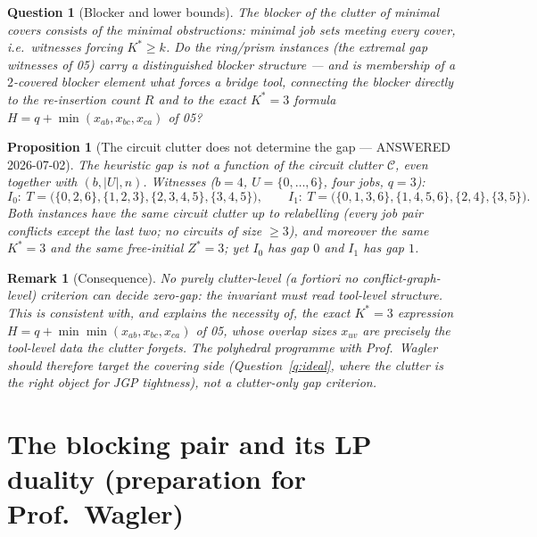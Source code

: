 \documentclass[11pt,a4paper]{article}
\newtheorem{proposition}{Proposition}
\newtheorem{question}{Question}
\newtheorem{remark}{Remark}
\newcommand{\Kstar}{K^{\ast}}
\newcommand{\ZSSP}{Z^{\ast}}
\begin{document}
\begin{question}[Blocker and lower bounds]\label{q:blocker}
The blocker of the clutter of minimal covers consists of the minimal
\emph{obstructions}: minimal job sets meeting every cover, i.e.\ witnesses
forcing $\Kstar\ge k$. Do the ring/prism instances (the extremal gap witnesses
of 05) carry a distinguished blocker structure --- and is membership of a
$2$-covered blocker element what forces a bridge tool, connecting the blocker
directly to the re-insertion count $R$ and to the exact $\Kstar=3$ formula
$H=q+\min(x_{ab},x_{bc},x_{ca})$ of 05?
\end{question}

\begin{proposition}[The circuit clutter does not determine the gap ---
ANSWERED 2026-07-02]\label{prop:notclutter}
The heuristic gap is \emph{not} a function of the circuit clutter
$\mathcal{C}$, even together with $(b,\lvert U\rvert,n)$. Witnesses ($b=4$,
$U=\{0,\dots,6\}$, four jobs, $q=3$):
\[
  I_0:\ T=\bigl(\{0,2,6\},\{1,2,3\},\{2,3,4,5\},\{3,4,5\}\bigr),
  \qquad
  I_1:\ T=\bigl(\{0,1,3,6\},\{1,4,5,6\},\{2,4\},\{3,5\}\bigr).
\]
Both instances have the same circuit clutter up to relabelling (every job pair
conflicts except the last two; no circuits of size $\ge3$), and moreover the
same $\Kstar=3$ and the same free-initial $\ZSSP=3$; yet $I_0$ has gap $0$ and
$I_1$ has gap $1$.
\end{proposition}

\begin{remark}[Consequence]
No purely clutter-level (a fortiori no conflict-graph-level) criterion can
decide zero-gap: the invariant must read \emph{tool-level} structure. This is
consistent with, and explains the necessity of, the exact $\Kstar=3$ expression
$H=q+\min\min(x_{ab},x_{bc},x_{ca})$ of 05, whose overlap sizes $x_{uv}$ are
precisely the tool-level data the clutter forgets. The polyhedral programme
with Prof.~Wagler should therefore target the \emph{covering} side
(Question~\ref{q:ideal}, where the clutter is the right object for JGP
tightness), not a clutter-only gap criterion.
\end{remark}

\section{The blocking pair and its LP duality (preparation for Prof.~Wagler)}
\end{document}
